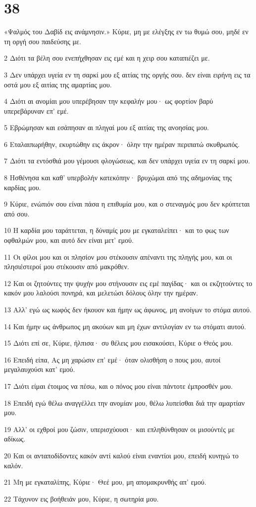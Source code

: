 \chapter{38}

\par «Ψαλμός του Δαβίδ εις ανάμνησιν.» Κύριε, μη με ελέγξης εν τω θυμώ σου, μηδέ εν τη οργή σου παιδεύσης με.
\par 2 Διότι τα βέλη σου ενεπήχθησαν εις εμέ και η χειρ σου καταπιέζει με.
\par 3 Δεν υπάρχει υγεία εν τη σαρκί μου εξ αιτίας της οργής σου. δεν είναι ειρήνη εις τα οστά μου εξ αιτίας της αμαρτίας μου.
\par 4 Διότι αι ανομίαι μου υπερέβησαν την κεφαλήν μου· ως φορτίον βαρύ υπερεβάρυναν επ' εμέ.
\par 5 Εβρώμησαν και εσάπησαν αι πληγαί μου εξ αιτίας της ανοησίας μου.
\par 6 Εταλαιπωρήθην, εκυρτώθην εις άκρον· όλην την ημέραν περιπατώ σκυθρωπός.
\par 7 Διότι τα εντόσθιά μου γέμουσι φλογώσεως, και δεν υπάρχει υγεία εν τη σαρκί μου.
\par 8 Ησθένησα και καθ' υπερβολήν κατεκόπην· βρυχώμαι από της αδημονίας της καρδίας μου.
\par 9 Κύριε, ενώπιόν σου είναι πάσα η επιθυμία μου, και ο στεναγμός μου δεν κρύπτεται από σου.
\par 10 Η καρδία μου ταράττεται, η δύναμίς μου με εγκαταλείπει· και το φως των οφθαλμών μου, και αυτό δεν είναι μετ' εμού.
\par 11 Οι φίλοι μου και οι πλησίον μου στέκουσιν απέναντι της πληγής μου, και οι πλησιέστεροί μου στέκουσιν από μακρόθεν.
\par 12 Και οι ζητούντες την ψυχήν μου στήνουσιν εις εμέ παγίδας· και οι εκζητούντες το κακόν μου λαλούσι πονηρά, και μελετώσι δόλους όλην την ημέραν.
\par 13 Αλλ' εγώ ως κωφός δεν ήκουον και ήμην ως άφωνος, μη ανοίγων το στόμα αυτού.
\par 14 Και ήμην ως άνθρωπος μη ακούων και μη έχων αντιλογίαν εν τω στόματι αυτού.
\par 15 Διότι επί σε, Κύριε, ήλπισα· συ θέλεις μου εισακούσει, Κύριε ο Θεός μου.
\par 16 Επειδή είπα, Ας μη χαρώσιν επ' εμέ· όταν ολισθήση ο πους μου, αυτοί μεγαλαυχούσι κατ' εμού.
\par 17 Διότι είμαι έτοιμος να πέσω, και ο πόνος μου είναι πάντοτε έμπροσθέν μου.
\par 18 Επειδή εγώ θέλω αναγγέλλει την ανομίαν μου, θέλω λυπείσθαι διά την αμαρτίαν μου.
\par 19 Αλλ' οι εχθροί μου ζώσιν, υπερισχύουσι· και επληθύνθησαν οι μισούντές με αδίκως.
\par 20 Και οι ανταποδίδοντες κακόν αντί καλού είναι εναντίοι μου, επειδή κυνηγώ το καλόν.
\par 21 Μη με εγκαταλίπης, Κύριε· Θεέ μου, μη απομακρυνθής απ' εμού.
\par 22 Τάχυνον εις βοήθειάν μου, Κύριε, η σωτηρία μου.

